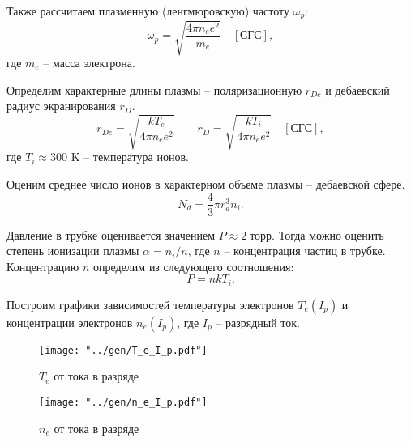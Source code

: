 Также рассчитаем плазменную (ленгмюровскую) частоту $\omega_p$:
$$ \omega_p = \sqrt{\frac{4\pi n_e e^2}{m_e}} \quad [\text{СГС}],$$
где $m_e$ -- масса электрона.

Определим характерные длины плазмы -- поляризационную $r_{De}$ и дебаевский радиус экранирования $r_D$.
$$ r_{De} = \sqrt{\frac{kT_e}{4\pi n_e e^2}} \qquad r_D = \sqrt{\frac{kT_i}{4\pi n_e e^2}}  \quad [\text{СГС}],$$
где $T_i \approx 300$ K -- температура ионов.

Оценим среднее число ионов в характерном объеме плазмы -- дебаевской сфере.
$$ N_d = \frac{4}{3} \pi r_d^3 n_i.$$

Давление в трубке оценивается значением $P \approx 2 \; \text{торр}$. Тогда можно оценить степень ионизации плазмы $\alpha = n_i/n$, где $n$ -- концентрация частиц в трубке. Концентрацию $n$ определим из следующего соотношения:
$$ P = n k T_i.$$

Построим графики зависимостей температуры электронов $T_e(I_p)$ и концентрации электронов $n_e(I_p)$, где $I_p$ -- разрядный ток.

\begin{figure}[H]
	\centering
	\begin{minipage}[c]{.5\textwidth}
		\centering
		\texttt{[image: "../gen/T\_e\_I\_p.pdf"]}
		\caption{$T_e$ от тока в разряде}
		\label{img:teip}
	\end{minipage}%
	\begin{minipage}[c]{.5\textwidth}
		\centering
		\texttt{[image: "../gen/n\_e\_I\_p.pdf"]}
		\caption{$n_e$ от тока в разряде}
		\label{img:neip}
	\end{minipage}
\end{figure}


